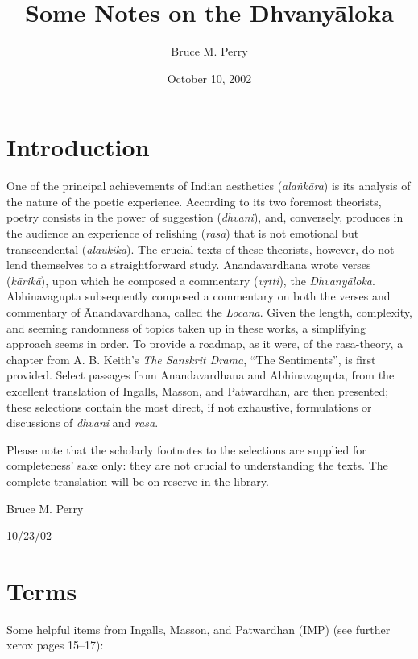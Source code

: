 \documentclass[12pt]{article}
\title{Some Notes on the Dhvanyāloka}
\author{Bruce M. Perry}
\date{October 10, 2002}
\begin{document}
\maketitle

\section{Introduction}

One of the principal achievements of Indian aesthetics (\textit{alaṅkāra}) is its analysis of the nature of the poetic experience.
According to its two foremost theorists, poetry consists in the power of suggestion (\textit{dhvani}), and, conversely, produces in the audience an experience of relishing (\textit{rasa}) that is not emotional but transcendental (\textit{alaukika}).
The crucial texts of these theorists, however, do not lend themselves to a straightforward study.
Anandavardhana wrote verses (\textit{kārikā}), upon which he composed a commentary (\textit{vṛtti}), the \textit{Dhvanyāloka}.
Abhinavagupta subsequently composed a commentary on both the verses and commentary of Ānandavardhana, called the \textit{Locana}.
Given the length, complexity, and seeming randomness of topics taken up in these works, a simplifying approach seems in order.
To provide a roadmap, as it were, of the rasa-theory, a chapter from A. B. Keith's \textit{The Sanskrit Drama}, ``The Sentiments'', is first provided.
Select passages from Ānandavardhana and Abhinavagupta, from the excellent translation of Ingalls, Masson, and Patwardhan, are then presented; these selections contain the most direct, if not exhaustive, formulations or discussions of \textit{dhvani} and \textit{rasa}.

Please note that the scholarly footnotes to the selections are supplied for completeness' sake only: they are not crucial to understanding the texts.
The complete translation will be on reserve in the library.


Bruce M. Perry

10/23/02

\newpage


\section{Terms}

Some helpful items from Ingalls, Masson, and Patwardhan (IMP) (see further xerox pages 15--17):
\end{document}

